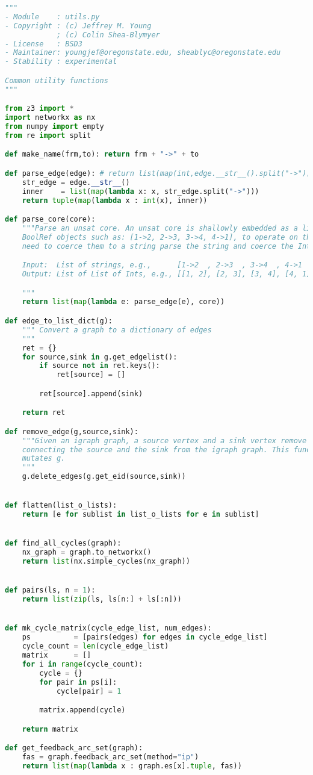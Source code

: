 \newpage
\begin{lstlisting}[language=python]
"""
- Module    : utils.py
- Copyright : (c) Jeffrey M. Young
            ; (c) Colin Shea-Blymyer
- License   : BSD3
- Maintainer: youngjef@oregonstate.edu, sheablyc@oregonstate.edu
- Stability : experimental

Common utility functions
"""

from z3 import *
import networkx as nx
from numpy import empty
from re import split

def make_name(frm,to): return frm + "->" + to

def parse_edge(edge): # return list(map(int,edge.__str__().split("->")))
    str_edge = edge.__str__()
    inner    = list(map(lambda x: x, str_edge.split("->")))
    return tuple(map(lambda x : int(x), inner))

def parse_core(core):
    """Parse an unsat core. An unsat core is shallowly embedded as a list of z3
    BoolRef objects such as: [1->2, 2->3, 3->4, 4->1], to operate on these we
    need to coerce them to a string parse the string and coerce the Ints out.

    Input:  List of strings, e.g.,      [1->2  , 2->3  , 3->4  , 4->1  ]
    Output: List of List of Ints, e.g., [[1, 2], [2, 3], [3, 4], [4, 1]]

    """
    return list(map(lambda e: parse_edge(e), core))

def edge_to_list_dict(g):
    """ Convert a graph to a dictionary of edges
    """
    ret = {}
    for source,sink in g.get_edgelist():
        if source not in ret.keys():
            ret[source] = []

        ret[source].append(sink)

    return ret

def remove_edge(g,source,sink):
    """Given an igraph graph, a source vertex and a sink vertex remove the edge
    connecting the source and the sink from the igraph graph. This function
    mutates g.
    """
    g.delete_edges(g.get_eid(source,sink))


def flatten(list_o_lists):
    return [e for sublist in list_o_lists for e in sublist]


def find_all_cycles(graph):
    nx_graph = graph.to_networkx()
    return list(nx.simple_cycles(nx_graph))


def pairs(ls, n = 1):
    return list(zip(ls, ls[n:] + ls[:n]))


def mk_cycle_matrix(cycle_edge_list, num_edges):
    ps          = [pairs(edges) for edges in cycle_edge_list]
    cycle_count = len(cycle_edge_list)
    matrix      = []
    for i in range(cycle_count):
        cycle = {}
        for pair in ps[i]:
            cycle[pair] = 1

        matrix.append(cycle)

    return matrix

def get_feedback_arc_set(graph):
    fas = graph.feedback_arc_set(method="ip")
    return list(map(lambda x : graph.es[x].tuple, fas))
\end{lstlisting}
